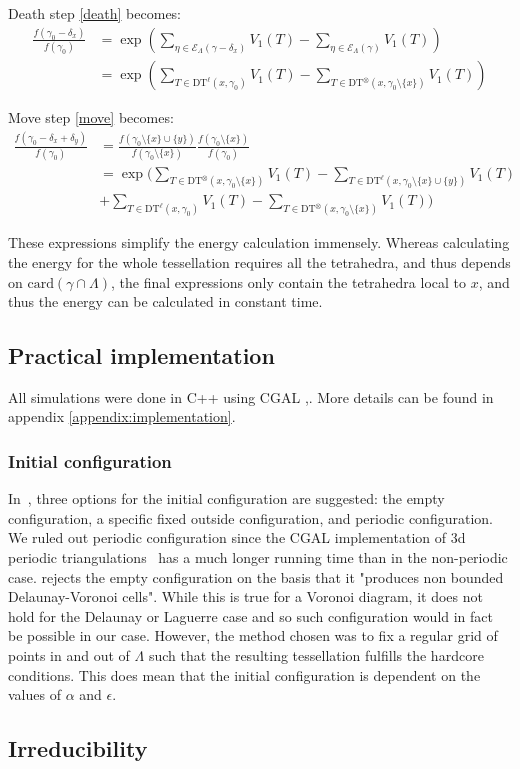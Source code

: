 Death step \ref{death} becomes:
\begin{align*}
\frac{f(\gamma_0 - \delta_x)}{f(\gamma_0)}&= \exp\left({\sum_{\eta\in \mathcal E_\Lambda(\gamma - \delta_x)} V_1(T)- \sum_{\eta\in \mathcal E_\Lambda(\gamma)}V_1(T)}\right)\\
&= \exp\left( \sum_{T\in \text{DT}^\ell (x,\gamma_0)} V_1(T) - \sum_{T \in \text{DT}^\otimes (x,\gamma_0 \setminus \{x\})} V_1(T)   \right)
\end{align*}

Move step \ref{move} becomes:
\begin{align*}
\frac{f(\gamma_0 - \delta_x + \delta_y)}{f(\gamma_0)}&= 
\frac{f(\gamma_0 \setminus \{x\} \cup \{y\})}{f(\gamma_0\setminus\{x\})} \frac{f(\gamma_0\setminus\{x\})}{f(\gamma_0)} \\ 
&= \exp \Bigg(  \sum_{T \in \text{DT}^\otimes (x,\gamma_0\setminus\{x\})} V_1(T)  - \sum_{T\in \text{DT}^\ell (x,\gamma_0\setminus\{x\}\cup\{y\})} V_1(T)  \\
&+ \sum_{T\in \text{DT}^\ell (x,\gamma_0)} V_1(T) - \sum_{T \in \text{DT}^\otimes (x,\gamma_0\setminus\{x\})} V_1(T)   
\Bigg)
\end{align*}



These expressions simplify the energy calculation immensely. Whereas calculating the energy for the whole tessellation requires all the tetrahedra, and thus depends on $\text{card}(\gamma\cap\Lambda)$, the final expressions only contain the tetrahedra local to $x$, and thus the energy can be calculated in constant time.


\subsection{Practical implementation}
All simulations were done in C++ using CGAL \cite{cgal},\cite{cgal:3d-triang}. More details can be found in appendix \ref{appendix:implementation}.
\subsubsection{Initial configuration}
In~\cite{DereudreLavancier2010}, three options for the initial configuration are suggested: the empty configuration, a specific fixed outside configuration, and periodic configuration.
We ruled out periodic configuration since the CGAL implementation of 3d periodic triangulations~\cite{cgal:3d-period} has a much longer running time than in the non-periodic case. 
\cite{DereudreLavancier2010} rejects the empty configuration on the basis that it "produces non bounded Delaunay-Voronoi cells". While this is true for a Voronoi diagram, it does not hold for the Delaunay or Laguerre case and so such configuration would in fact be possible in our case.
However, the method chosen was to fix a regular grid of points in and out of $\Lambda$ such that the resulting tessellation fulfills the hardcore conditions. This does mean that the initial configuration is dependent on the values of $\alpha$ and $\epsilon$. 


\subsection{Irreducibility}
\tbd

